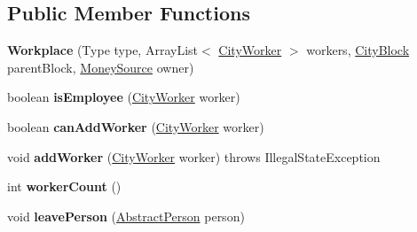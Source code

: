 \subsection*{Public Member Functions}
\begin{DoxyCompactItemize}
\item 
{\bfseries Workplace} (Type type, Array\+List$<$ \hyperlink{classpeople_1_1cityworkers_1_1_city_worker}{City\+Worker} $>$ workers, \hyperlink{classcities_1_1_city_block}{City\+Block} parent\+Block, \hyperlink{classuniverse_1_1_money_source}{Money\+Source} owner)\hypertarget{classbuildings_1_1workplaces_1_1_workplace_af2f253302f256f093348a17fecb8f8d4}{}\label{classbuildings_1_1workplaces_1_1_workplace_af2f253302f256f093348a17fecb8f8d4}

\item 
boolean {\bfseries is\+Employee} (\hyperlink{classpeople_1_1cityworkers_1_1_city_worker}{City\+Worker} worker)\hypertarget{classbuildings_1_1workplaces_1_1_workplace_adea1a3d2a3170acc74d09a6e032c257a}{}\label{classbuildings_1_1workplaces_1_1_workplace_adea1a3d2a3170acc74d09a6e032c257a}

\item 
boolean {\bfseries can\+Add\+Worker} (\hyperlink{classpeople_1_1cityworkers_1_1_city_worker}{City\+Worker} worker)\hypertarget{classbuildings_1_1workplaces_1_1_workplace_a8b79a31d21cd5d2d243219017a79a69f}{}\label{classbuildings_1_1workplaces_1_1_workplace_a8b79a31d21cd5d2d243219017a79a69f}

\item 
void {\bfseries add\+Worker} (\hyperlink{classpeople_1_1cityworkers_1_1_city_worker}{City\+Worker} worker)  throws Illegal\+State\+Exception 	\hypertarget{classbuildings_1_1workplaces_1_1_workplace_ad90009089d718b8e43cecfb752a4f4d7}{}\label{classbuildings_1_1workplaces_1_1_workplace_ad90009089d718b8e43cecfb752a4f4d7}

\item 
int {\bfseries worker\+Count} ()\hypertarget{classbuildings_1_1workplaces_1_1_workplace_ad85497df84e456c90ce9446bb8a39cdf}{}\label{classbuildings_1_1workplaces_1_1_workplace_ad85497df84e456c90ce9446bb8a39cdf}

\item 
void {\bfseries leave\+Person} (\hyperlink{classpeople_1_1_abstract_person}{Abstract\+Person} person)\hypertarget{classbuildings_1_1workplaces_1_1_workplace_a27a8e76eb370c69cd7de238455764c15}{}\label{classbuildings_1_1workplaces_1_1_workplace_a27a8e76eb370c69cd7de238455764c15}


\end{DoxyCompactItemize}
